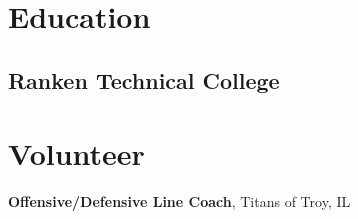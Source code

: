 \documentclass{TTurner}
\begin{document}
\begin{minipage}[t]{0.23\textwidth}
\section{Education} 
\subsection{Ranken Technical College}

\section{Volunteer} 
{\textbf{Offensive/Defensive Line Coach}, Titans of Troy, IL}






\end{minipage} 
\end{document}
